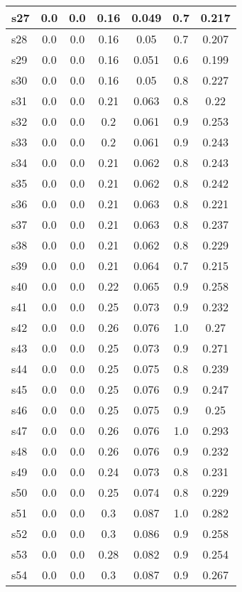 \documentclass{article}
\begin{document}
\begin{tabular}{|l|c|c|c|c|c|c|}
\hline
s27 &0.0 & 0.0 & 0.16 & 0.049 & 0.7 & 0.217\\
\hline
s28 &0.0 & 0.0 & 0.16 & 0.05 & 0.7 & 0.207\\
\hline
s29 &0.0 & 0.0 & 0.16 & 0.051 & 0.6 & 0.199\\
\hline
s30 &0.0 & 0.0 & 0.16 & 0.05 & 0.8 & 0.227\\
\hline
s31 &0.0 & 0.0 & 0.21 & 0.063 & 0.8 & 0.22\\
\hline
s32 &0.0 & 0.0 & 0.2 & 0.061 & 0.9 & 0.253\\
\hline
s33 &0.0 & 0.0 & 0.2 & 0.061 & 0.9 & 0.243\\
\hline
s34 &0.0 & 0.0 & 0.21 & 0.062 & 0.8 & 0.243\\
\hline
s35 &0.0 & 0.0 & 0.21 & 0.062 & 0.8 & 0.242\\
\hline
s36 &0.0 & 0.0 & 0.21 & 0.063 & 0.8 & 0.221\\
\hline
s37 &0.0 & 0.0 & 0.21 & 0.063 & 0.8 & 0.237\\
\hline
s38 &0.0 & 0.0 & 0.21 & 0.062 & 0.8 & 0.229\\
\hline
s39 &0.0 & 0.0 & 0.21 & 0.064 & 0.7 & 0.215\\
\hline
s40 &0.0 & 0.0 & 0.22 & 0.065 & 0.9 & 0.258\\
\hline
s41 &0.0 & 0.0 & 0.25 & 0.073 & 0.9 & 0.232\\
\hline
s42 &0.0 & 0.0 & 0.26 & 0.076 & 1.0 & 0.27\\
\hline
s43 &0.0 & 0.0 & 0.25 & 0.073 & 0.9 & 0.271\\
\hline
s44 &0.0 & 0.0 & 0.25 & 0.075 & 0.8 & 0.239\\
\hline
s45 &0.0 & 0.0 & 0.25 & 0.076 & 0.9 & 0.247\\
\hline
s46 &0.0 & 0.0 & 0.25 & 0.075 & 0.9 & 0.25\\
\hline
s47 &0.0 & 0.0 & 0.26 & 0.076 & 1.0 & 0.293\\
\hline
s48 &0.0 & 0.0 & 0.26 & 0.076 & 0.9 & 0.232\\
\hline
s49 &0.0 & 0.0 & 0.24 & 0.073 & 0.8 & 0.231\\
\hline
s50 &0.0 & 0.0 & 0.25 & 0.074 & 0.8 & 0.229\\
\hline
s51 &0.0 & 0.0 & 0.3 & 0.087 & 1.0 & 0.282\\
\hline
s52 &0.0 & 0.0 & 0.3 & 0.086 & 0.9 & 0.258\\
\hline
s53 &0.0 & 0.0 & 0.28 & 0.082 & 0.9 & 0.254\\
\hline
s54 &0.0 & 0.0 & 0.3 & 0.087 & 0.9 & 0.267\\
\hline

\end{tabular}
\end{document}
